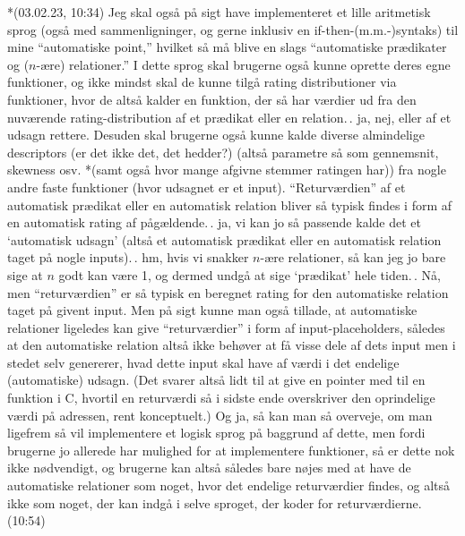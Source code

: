 \documentclass{report}
\begin{document}
*(03.02.23, 10:34) Jeg skal også på sigt have implementeret et lille aritmetisk sprog (også med sammenligninger, og gerne inklusiv en if-then-(m.m.-)syntaks) til mine ``automatiske point,'' hvilket så må blive en slags ``automatiske prædikater og ($n$-ære) relationer.'' I dette sprog skal brugerne også kunne oprette deres egne funktioner, og ikke mindst skal de kunne tilgå rating distributioner via funktioner, hvor de altså kalder en funktion, der så har værdier ud fra den nuværende rating-distribution af et prædikat eller en relation.\,. ja, nej, eller af et udsagn rettere. Desuden skal brugerne også kunne kalde diverse almindelige descriptors (er det ikke det, det hedder?) (altså parametre så som gennemsnit, skewness osv. *(samt også hvor mange afgivne stemmer ratingen har)) fra nogle andre faste funktioner (hvor udsagnet er et input). ``Returværdien'' af et automatisk prædikat eller en automatisk relation bliver så typisk findes i form af en automatisk rating af pågældende.\,. ja, vi kan jo så passende kalde det et `automatisk udsagn' (altså et automatisk prædikat eller en automatisk relation taget på nogle inputs).\,. hm, hvis vi snakker $n$-ære relationer, så kan jeg jo bare sige at $n$ godt kan være 1, og dermed undgå at sige `prædikat' hele tiden.\,. Nå, men ``returværdien'' er så typisk en beregnet rating for den automatiske relation taget på givent input. Men på sigt kunne man også tillade, at automatiske relationer ligeledes kan give ``returværdier'' i form af input-placeholders, således at den automatiske relation altså ikke behøver at få visse dele af dets input men i stedet selv genererer, hvad dette input skal have af værdi i det endelige (automatiske) udsagn. (Det svarer altså lidt til at give en pointer med til en funktion i C, hvortil en returværdi så i sidste ende overskriver den oprindelige værdi på adressen, rent konceptuelt.) Og ja, så kan man så overveje, om man ligefrem så vil implementere et logisk sprog på baggrund af dette, men fordi brugerne jo allerede har mulighed for at implementere funktioner, så er dette nok ikke nødvendigt, og brugerne kan altså således bare nøjes med at have de automatiske relationer som noget, hvor det endelige returværdier findes, og altså ikke som noget, der kan indgå i selve sproget, der koder for returværdierne. (10:54)
\end{document}
